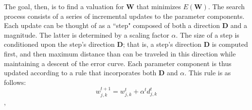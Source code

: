 
The goal, then, is to find a valuation for $\mathbf{W}$ that minimizes  $E(\mathbf{W})$. 
The search process consists of a series of incremental updates to the parameter components. Each update can be thought of as a ``step" composed of both a direction $\textbf{D}$ and a magnitude. The latter is determined by a scaling factor $\alpha$. The size of a step is conditioned upon the step's direction $\textbf{D}$; that is, a step's direction $\textbf{D}$ is computed first, and then maximum distance than can be traveled in this direction while maintaining a descent of the error curve. 
Each parameter component is thus updated according to a rule that incorporates both $\textbf{D}$ and $\alpha$. This rule is as follows:
\begin{equation}\label{eq:gen-update}
w^{t+1}_{j,k} = w^{t}_{j,k} + \alpha^{t}d^{t}_{j,k}
\end{equation},
